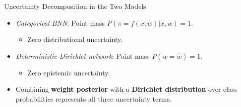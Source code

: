 \begin{frame}{Uncertainty Decomposition in the Two Models}
    \label{frm:predictive-entropy}
    \label{frm:aleatoric-intuition}
    \label{frm:distributional-intuition}
    \begin{itemize}
    \setlength{\itemsep}{5mm}

        \item \emph{Categorical BNN}: Point mass $P(\pi=f(x;w)|x,w)=1$.
        \begin{itemize}
            \item %
            Zero distributional uncertainty.
        \end{itemize}
    
        \item \emph{Deterministic Dirichlet network}: Point mass $P(w=\hat w)=1$.
        \begin{itemize} 
        \item %
        Zero epistemic uncertainty.
    \end{itemize}
    \item Combining \textbf{weight posterior} with a \textbf{Dirichlet distribution} over class probabilities represents all three uncertainty terms. %
    \end{itemize}
    \end{frame}
    


